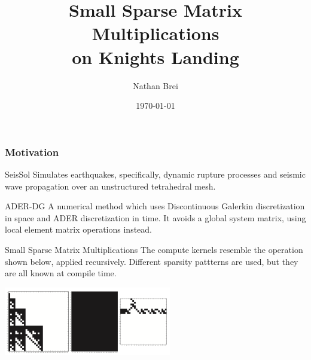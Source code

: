 \documentclass[9pt]{beamer}
\title{Small Sparse Matrix Multiplications\\ on Knights Landing}
\author{Nathan Brei}
\institute{Technical University of Munich}
\date\today
\begin{document}
\begin{frame}
  \titlepage
\end{frame}



\begin{frame}
  \frametitle{Motivation}
  
  \begin{block}{SeisSol}
    Simulates earthquakes, specifically, dynamic rupture processes and seismic wave propagation over an unstructured tetrahedral mesh. 
  \end{block}

  \begin{block}{ADER-DG}
    A numerical method which uses Discontinuous Galerkin discretization in space and ADER discretization in time. It avoids a global system matrix, using local element matrix operations instead.
  \end{block}

  \begin{block}{Small Sparse Matrix Multiplications}
    The compute kernels resemble the operation shown below, applied recursively. Different sparsity pattterns are used, but they are all known at compile time.
  \end{block}

  \centering
  \includegraphics[height=3cm]{images/seissol_visc.png}

\end{frame}
\end{document}
